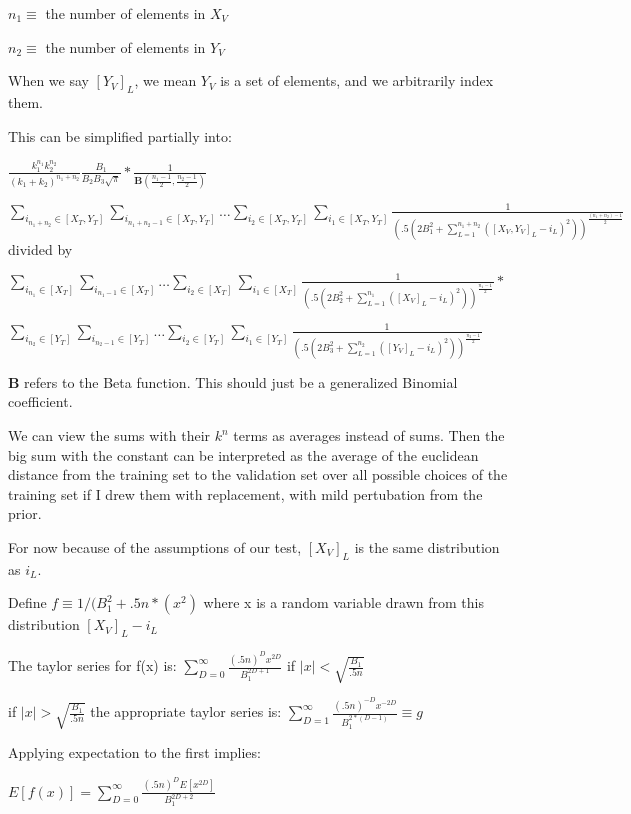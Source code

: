 \documentclass[11pt]{article}
\begin{document}
$n_1 \equiv $ the number of elements in $X_V$

$n_2 \equiv $ the number of elements in $Y_V$


When we say $[Y_V]_{L}$, we mean $Y_V$ is a set of elements, and we arbitrarily index them.

This can be simplified partially into:

$\frac{k_1^{n_1}k_2^{n_2}}{(k_1 + k_2)^{n_1+n_2}} \frac{B_1}{B_2 B_3 \sqrt{\pi}} * \frac{1}{ \mathbf{B}(\frac{n_1 -1}{2}, \frac{n_2 -1}{2})} $ 

$ \sum_{i_{n_1+n_2} \in [X_T, Y_T]} \sum_{i_{n_1+n_2-1}\in [X_T, Y_T]} \ldots  \sum_{i_{2}\in [X_T, Y_T]} \sum_{i_{1}\in [X_T, Y_T]} \frac{1}{(.5(2B_1^2 +  \sum_{L=1}^{n_1+n_2} ([X_V, Y_V]_{L} - i_L)^2))^{\frac{(n_1+n_2)-1}{2}}} $ divided by 

$ \sum_{i_{n_1} \in [X_T]} \sum_{i_{n_1-1}\in [X_T]} \ldots  \sum_{i_{2}\in [X_T]} \sum_{i_{1}\in [X_T]} \frac{1}{(.5(2B_2^2 +  \sum_{L=1}^{{n_1}} ([X_V]_{L} - i_L)^2))^{\frac{{n_1}-1}{2}}}  * $

$ \sum_{i_{n_2} \in [Y_T]} \sum_{i_{n_2-1}\in [Y_T]} \ldots  \sum_{i_{2}\in [Y_T]} \sum_{i_{1}\in [Y_T]} \frac{1}{(.5(2B_3^2 +  \sum_{L=1}^{n_2} ([Y_V]_{L} - i_L)^2))^{\frac{n_2-1}{2}}} $

$\mathbf{B}$ refers to the Beta function. This should just be a generalized Binomial coefficient.

We can view the sums with their $k^n$ terms as averages instead of sums. Then the big sum with the constant can be interpreted as the average of the euclidean distance from the training set to the validation set over all possible choices of the training set if I drew them with replacement, with mild pertubation from the prior.

For now because of the assumptions of our test, $[X_V]_{L}$ is the same distribution as $i_L$.

Define $f \equiv 1 / (B_1^2 + .5n*(x^2)$ where x is a random variable drawn from this distribution $[X_V]_{L} - i_L$

The taylor series for f(x) is: $\sum_{D=0}^\infty \frac{(.5n)^{D}x^{2D}}{B_1^{2D+1}}$ if $|x| < \sqrt{\frac{B_1}{.5n}} $

if $|x| > \sqrt{\frac{B_1}{.5n}}$ the appropriate taylor series is: $\sum_{D=1}^\infty \frac{(.5n)^{-D}x^{-2D}}{B_1^{2*(D-1)}} \equiv g$ 

Applying expectation to the first implies: 

$E[f(x)] = \sum_{D=0}^\infty \frac{(.5n)^D E[x^{2D}]}{B_1^{2D+2}}$
\end{document}
